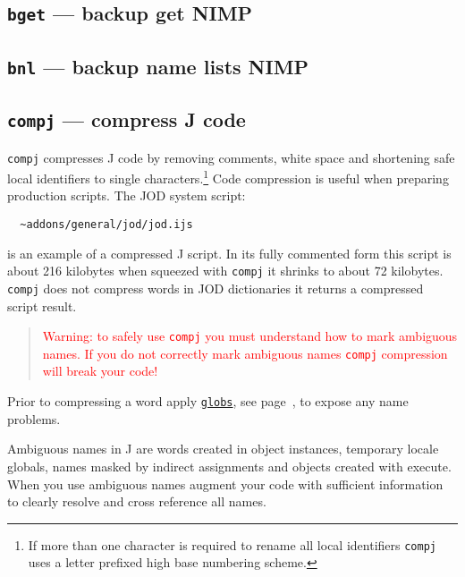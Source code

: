 \subsection{\texttt{bget} --- backup get NIMP}\label{ss:bget}   

\subsection{\texttt{bnl} --- backup name lists NIMP}\label{ss:bnl}   

\subsection{\texttt{compj} --- compress J code}

  \texttt{compj} compresses J code by
  removing comments, white space and shortening safe local identifiers to single
  characters.\footnote{If more than one character is required to rename all
  local identifiers \texttt{compj} uses a letter prefixed high base numbering scheme. }
  Code compression is useful when preparing production scripts. The
  JOD system script:
  
\begin{verbatim}
  ~addons/general/jod/jod.ijs
\end{verbatim}

  is an example of a compressed J script. In its fully commented
  form this script is about 216 kilobytes when squeezed with
  \texttt{compj} it shrinks to about 72 kilobytes.
  \texttt{compj} does not compress words in JOD
  dictionaries it returns a compressed script result.
  
\begin{quotation}
 \noindent\textcolor{red}{Warning: to safely use
	  \texttt{compj} you must understand how to mark
	  ambiguous names. If you do not correctly mark ambiguous names
	  \texttt{compj} compression will break your
	  code!}
\end{quotation}
  
  Prior to compressing a word apply \hyperlink{il:globs}{\texttt{globs}}, 
  see page~\pageref{ss:globs}, to expose any name problems.

  Ambiguous names in J are words created in object instances,
  temporary locale globals, names masked by indirect assignments and objects
  created with execute. When you use ambiguous names augment your code with
  sufficient information to clearly resolve and cross reference
   all names. 
  
